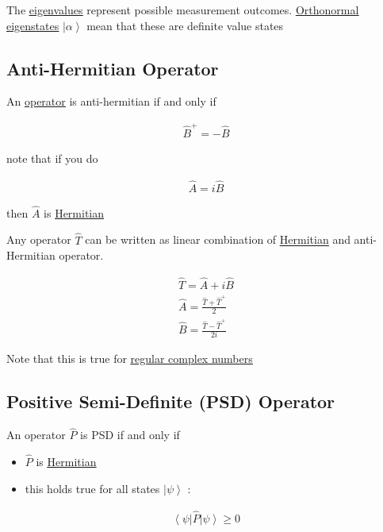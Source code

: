 \documentclass[
]{article}
\providecommand{\tightlist}{%
  \setlength{\itemsep}{0pt}\setlength{\parskip}{0pt}}
\let\oldhyperref\hyperref
\renewcommand{\hyperref}[2][]{\oldhyperref[#1]{\underline{#2}}}
\providecommand{\ket}[1]{\left\lvert #1 \right\rangle}
\providecommand{\bra}[1]{\left\langle #1 \right\rvert}
\begin{document}
The \hyperref[eigenvectorseigenvalues]{eigenvalues} represent possible measurement outcomes. \hyperref[orthonormality]{Orthonormal}
\hyperref[eigenstates]{eigenstates} \(\ket{\alpha}\) mean that these are definite value states


\subsection{Anti-Hermitian Operator}\label{anti-hermitian-operators}

An \hyperref[operators]{operator} is anti-hermitian if and only if

\begin{gather*}
	\hat{B}^+=-\hat{B}
\end{gather*}

note that if you do

\begin{gather*}
	\hat{A}=i\hat{B}
\end{gather*}

then \(\hat{A}\) is \hyperref[hermitian-operators]{Hermitian}

Any operator \(\hat{T}\) can be written as linear combination of
\hyperref[hermitian-operators]{Hermitian} and anti-Hermitian operator.


\begin{gather*}
	\hat{T}=\hat{A}+i\hat{B}\\
	\hat{A}=\frac{\hat{T}+\hat{T}^+}{2}\\
	\hat{B}=\frac{\hat{T}-\hat{T}^+}{2i}
\end{gather*}

Note that this is true for \hyperref[complex-number-decomposition]{regular complex numbers}
\subsection{Positive Semi-Definite (PSD)
	Operator}\label{positive-semi-definite-psd-operators}

An operator \(\hat{P}\) is PSD if and only if

\begin{itemize}
	\tightlist
	\item
	      \(\hat{P}\) is \hyperref[hermitian-operators]{Hermitian}
	\item
	      this holds true for all states \(\ket{\psi}\) :
\end{itemize}

\begin{gather*}
	\bra{\psi}\hat{P}\ket{\psi}\geq 0
\end{gather*}
\end{document}
